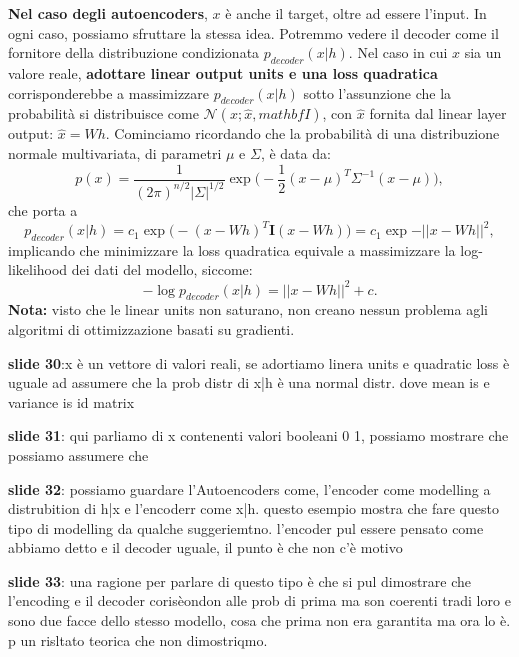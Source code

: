 \textbf{Nel caso degli autoencoders}, $x$ è anche il target, oltre ad essere l'input. In ogni caso, possiamo
sfruttare la stessa idea.
\newline
Potremmo vedere il decoder come il fornitore della distribuzione condizionata $p_{decoder}(x|h)$.
\newline
\newline
Nel caso in cui $x$ sia un valore reale, \textbf{adottare linear output units e una loss quadratica} 
corrisponderebbe a massimizzare $p_{decoder}(x|h)$ sotto l'assunzione che la probabilità si distribuisce come 
$\mathcal{N}(x;\hat{x},mathbf{I})$, con $\hat{x}$ fornita dal linear layer output: $\hat{x}=Wh$. Cominciamo
ricordando che la probabilità di una distribuzione normale multivariata, di parametri $\mu$ e $\Sigma$, 
è data da:
\begin{equation}
  p(x)=\frac{1}{(2\pi)^{n/2}|\Sigma|^{1/2}}\exp{\Big(-\frac{1}{2}(x-\mu)^T\Sigma^{-1}(x-\mu) \Big)},
\end{equation}
che porta a
\begin{equation}
  p_{decoder}(x|h)=c_1\exp{\Big(-(x-Wh)^T\mathbf{I}(x-Wh)\Big)}=c_1\exp{-||x-Wh||^2},
\end{equation}
implicando che minimizzare la loss quadratica equivale a massimizzare la log-likelihood dei dati del modello,
siccome:
\begin{equation}
  -\log{p_{decoder}(x|h)}=||x-Wh||^2+c.
\end{equation}
\textbf{Nota:} visto che le linear units non saturano, non creano nessun problema agli algoritmi di ottimizzazione
basati su gradienti.
\newpage

\textbf{slide 30}:x è un vettore di valori reali,  se adortiamo linera units e quadratic loss è uguale ad assumere che la prob 
distr di x|h è una normal distr. dove mean is e variance is id matrix

\textbf{slide 31}: qui parliamo di x contenenti valori booleani 0 1, possiamo mostrare che possiamo 
assumere che 

\textbf{slide 32}: possiamo guardare l'Autoencoders come, l'encoder come modelling a distrubition di h|x
e l'encoderr come x|h. questo esempio mostra che fare questo tipo di modelling da qualche suggeriemtno.
l'encoder pul essere pensato come abbiamo detto e il decoder uguale, il punto è che non c'è motivo

\textbf{slide 33}: una ragione per parlare di questo tipo è che si pul dimostrare che l'encoding e il decoder
corisèondon alle prob di prima ma son coerenti tradi loro e sono due facce dello stesso modello, cosa che
prima non era garantita ma ora lo è. p un risltato teorica che non dimostriqmo.

